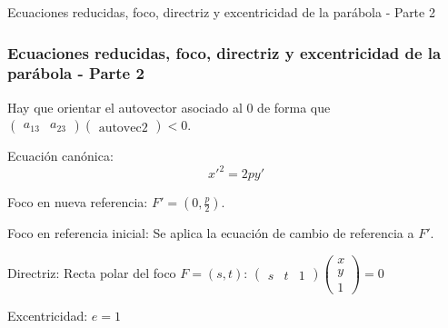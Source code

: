 \documentclass[xcolor={dvipsnames},aspectratio=169,10pt]{beamer}
\begin{document}
\begin{frame}{Ecuaciones reducidas, foco, directriz y excentricidad de la parábola - Parte 2}
  \frametitle{Ecuaciones reducidas, foco, directriz y excentricidad de la parábola - Parte 2}
    Hay que orientar el autovector asociado al 0 de forma que $\begin{pmatrix} a_{13} & a_{23} \end{pmatrix} \begin{pmatrix} \text{autovec2} \end{pmatrix} < 0$.
    
    Ecuación canónica:
    \[x'^2 = 2py'\]
    
    Foco en nueva referencia: $F' = (0, \frac{p}{2})$.
    
    Foco en referencia inicial: Se aplica la ecuación de cambio de referencia a $F'$.
    
    Directriz: Recta polar del foco $F = (s, t)$: $\begin{pmatrix} s & t & 1 \end{pmatrix} \begin{pmatrix} x \\ y \\ 1 \end{pmatrix} = 0$
    
    Excentricidad: $e = 1$
\end{frame}
\end{document}
